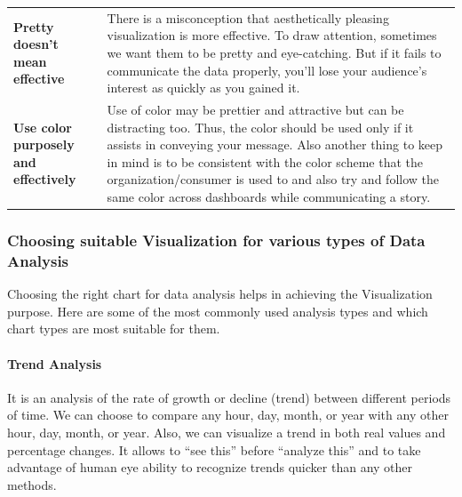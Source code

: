\documentclass[]{book}
\let\oldparagraph\paragraph
\renewcommand{\paragraph}[1]{\oldparagraph{#1}\mbox{}}
\begin{document}
\begin{longtable}[]{@{}ll@{}}
\begin{minipage}[t]{0.19\columnwidth}
\textbf{Pretty doesn't mean effective}\strut
\end{minipage} & \begin{minipage}[t]{0.75\columnwidth}\raggedright
There is a misconception that aesthetically pleasing visualization is more effective. To draw attention, sometimes we want them to be pretty and eye-catching. But if it fails to communicate the data properly, you'll lose your audience's interest as quickly as you gained it.\strut
\end{minipage}\tabularnewline
\begin{minipage}[t]{0.19\columnwidth}\raggedright
\textbf{Use color purposely and effectively}\strut
\end{minipage} & \begin{minipage}[t]{0.75\columnwidth}\raggedright
Use of color may be prettier and attractive but can be distracting too. Thus, the color should be used only if it assists in conveying your message. Also another thing to keep in mind is to be consistent with the color scheme that the organization/consumer is used to and also try and follow the same color across dashboards while communicating a story.\strut
\end{minipage}\tabularnewline
\bottomrule
\end{longtable}

\hypertarget{choosing-suitable-visualization-for-various-types-of-data-analysis}{%
\subsubsection{Choosing suitable Visualization for various types of Data Analysis}\label{choosing-suitable-visualization-for-various-types-of-data-analysis}}

Choosing the right chart for data analysis helps in achieving the Visualization purpose. Here are some of the most commonly used analysis types and which chart types are most suitable for them.

\hypertarget{trend-analysis}{%
\paragraph{Trend Analysis}\label{trend-analysis}}

It is an analysis of the rate of growth or decline (trend) between different periods of time. We can choose to compare any hour, day, month, or year with any other hour, day, month, or year. Also, we can visualize a trend in both real values and percentage changes. It allows to ``see this'' before ``analyze this'' and to take advantage of human eye ability to recognize trends quicker than any other methods.
\end{document}
